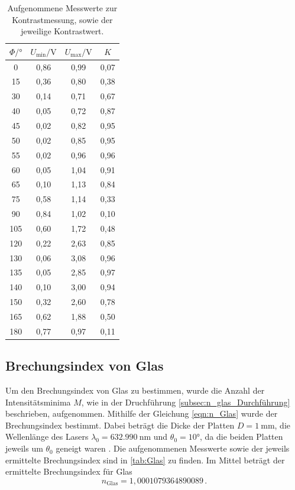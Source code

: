 \begin{table}[H]
  \centering
  \caption{Aufgenommene Messwerte zur Kontrastmessung, sowie der jeweilige Kontrastwert.}
  \label{tab:Kontrast}
  \begin{tabular}{c c c c}
    \toprule
    $\Phi / \si{\degree} $ & $U_{\text{min}} / \si{\volt}$ & $U_{\text{max}} / \si{\volt}$ & $K$ \\
    \midrule
    0     &  0,86  &  0,99  & 0,07  \\
    15    &  0,36  &  0,80  & 0,38  \\
    30    &  0,14  &  0,71  & 0,67  \\
    40    &  0,05  &  0,72  & 0,87  \\
    45    &  0,02  &  0,82  & 0,95  \\
    50    &  0,02  &  0,85  & 0,95  \\
    55    &  0,02  &  0,96  & 0,96  \\
    60    &  0,05  &  1,04  & 0,91  \\
    65    &  0,10  &  1,13  & 0,84  \\
    75    &  0,58  &  1,14  & 0,33  \\
    90    &  0,84  &  1,02  & 0,10  \\
    105   &  0,60  &  1,72  & 0,48  \\
    120   &  0,22  &  2,63  & 0,85  \\
    130   &  0,06  &  3,08  & 0,96  \\
    135   &  0,05  &  2,85  & 0,97  \\
    140   &  0,10  &  3,00  & 0,94  \\
    150   &  0,32  &  2,60  & 0,78  \\
    165   &  0,62  &  1,88  & 0,50  \\
    180   &  0,77  &  0,97  & 0,11  \\
    \bottomrule
  \end{tabular}
\end{table}

\subsection{Brechungsindex von Glas}
\label{subsec:n_Glas}
Um den Brechungsindex von Glas zu bestimmen, wurde die Anzahl der Intensitätsminima $M$, wie in der Druchführung \ref{subsec:n_glas_Durchführung} beschrieben, aufgenommen.
Mithilfe der Gleichung \eqref{eqn:n_Glas} wurde der Brechungsindex bestimmt.
Dabei beträgt die Dicke der Platten $D = \SI{1}{\milli\metre}$, die Wellenlänge des Lasers $\lambda_0 = \SI{632.990}{\nano\metre}$ und $\theta_0 = 10°$, da die beiden Platten jeweils um $\theta_0$ geneigt waren \cite{anleitung}.
Die aufgenommenen Messwerte sowie der jeweils ermittelte Brechungsindex sind in \autoref{tab:Glas} zu finden.
Im Mittel beträgt der ermittelte Brechungsindex für Glas 
\begin{equation*}
    n_\text{Glas} = 1,0001079364890089 \,.
\end{equation*}

